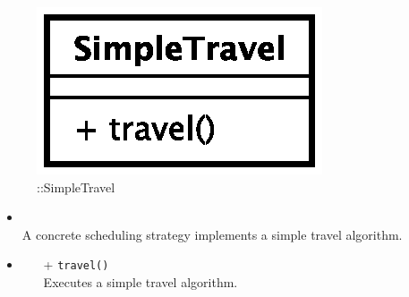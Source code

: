 \begin{figure}[h]
\centering
\includegraphics[scale=0.6,keepaspectratio]{images/solution/app/backend/simple_travel.eps}
\caption{\pActive::SimpleTravel}
\label{fig:sd-app-scheduling-simple-travel}
\end{figure}
\FloatBarrier
\begin{itemize}
  \item \textbf{\descr} \\
    A concrete scheduling strategy implements a simple travel algorithm.
  \item \textbf{\ops}
  \begin{itemize}
    \item[+] \texttt{travel()} \\
    Executes a simple travel algorithm.
  \end{itemize}
\end{itemize}
